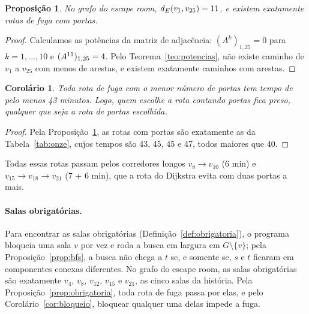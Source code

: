 \documentclass{article}
\theoremstyle{definition}
\theoremstyle{plain}
\newtheorem{proposicao}[definicao]{Proposição}
\newtheorem{corolario}[definicao]{Corolário}
\newcommand{\dE}{d_E}
\begin{document}
\begin{proposicao}\label{prop:onze}
No grafo do escape room, $\dE(v_1, v_{25}) = \kmin$, e existem exatamente
\qtdcaminhos{} rotas de fuga com \kmin{} portas.
\end{proposicao}

\begin{proof}
Calculamos as potências da matriz de adjacência: $(A^k)_{1,25} = 0$ para
$k = 1, \dots, 10$ e $(A^{11})_{1,25} = 4$. Pelo
Teorema~\ref{teo:potencias}, não existe caminho de $v_1$ a $v_{25}$ com menos de
\kmin{} arestas, e existem exatamente \qtdcaminhos{} caminhos com \kmin{} arestas.
\end{proof}

\begin{table}[H]
    \centering
    \caption{As \qtdcaminhos{} rotas de fuga com \kmin{} portas e o tempo de cada uma.}
    \label{tab:onze}
    \small
    
\end{table}

\begin{corolario}\label{cor:contar}
Toda rota de fuga com o menor número de portas tem tempo de pelo menos 43
minutos. Logo, quem escolhe a rota contando portas fica preso, qualquer que seja a
rota de \kmin{} portas escolhida.
\end{corolario}

\begin{proof}
Pela Proposição~\ref{prop:onze}, as rotas com \kmin{} portas são exatamente as da
Tabela~\ref{tab:onze}, cujos tempos são 43, 45, 45 e 47, todos maiores que 40.
\end{proof}

Todas essas rotas passam pelos corredores longos $v_8 \to v_{10}$ (6 min) e
$v_{15} \to v_{18} \to v_{21}$ (7 + 6 min), que a rota do Dijkstra evita com duas
portas a mais.

\paragraph{Salas obrigatórias.} Para encontrar as salas obrigatórias
(Definição~\ref{def:obrigatoria}), o programa bloqueia uma sala $v$ por vez e roda
a busca em largura em $G \setminus \{v\}$; pela Proposição~\ref{prop:bfs}, a
busca não chega a $t$ se, e somente se, $s$ e $t$ ficaram em componentes conexas
diferentes. No grafo do escape room, as salas obrigatórias são exatamente $v_4$,
$v_8$, $v_{12}$, $v_{15}$ e $v_{21}$, as cinco salas da história. Pela
Proposição~\ref{prop:obrigatoria}, toda rota de fuga passa por elas, e pelo
Corolário~\ref{cor:bloqueio}, bloquear qualquer uma delas impede a fuga.
\end{document}
